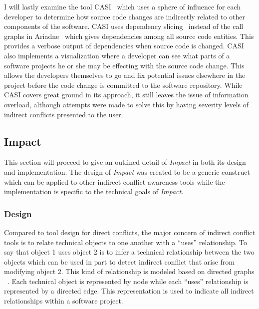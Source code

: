 I will lastly examine the tool CASI~\cite{Servant:2010:CPI} which uses
a sphere of influence for each developer to determine how source code
changes are indirectly related to other components of the software.
CASI uses dependency slicing~\cite{Bajracharya:2009:SIS} instead of the 
call graphs in Ariadne~\cite{Trainer:2005:BGT} which gives dependencies among
all source code entities. This provides a verbose output of dependencies when
source code is changed. CASI also implements a visualization where
a developer can see what parts of a software projects he or she may be effecting
with the source code change. This allows the developers themselves to go and fix
potential issues elsewhere in the project before the code change is committed
to the software repository. While CASI covers great ground in its approach,
it still leaves the issue of information overload, although attempts were made
to solve this by having severity levels of indirect conflicts presented to
the user.

\subsection{Impact}
This section will proceed to give an outlined detail of \textit{Impact} in both its
design and implementation. The design of \textit{Impact} was created to be
a generic construct which can be applied to other indirect conflict 
awareness tools while the implementation is specific to the technical
goals of \textit{Impact}.

\subsubsection{Design}
Compared to tool design for direct conflicts, the major concern of 
indirect conflict tools is to relate technical objects to one another
with a ``uses'' relationship. To say that object 1 uses object 2 is to infer
a technical relationship between the two objects which can be used
in part to detect indirect conflict that arise from modifying object
2. This kind of relationship is modeled based on directed graphs ~\cite{Horwitz:1992:UPD}. 
Each technical object is represented by node while each ``uses''
relationship is represented by a directed edge. This representation
is used to indicate all indirect relationships within a software project.

